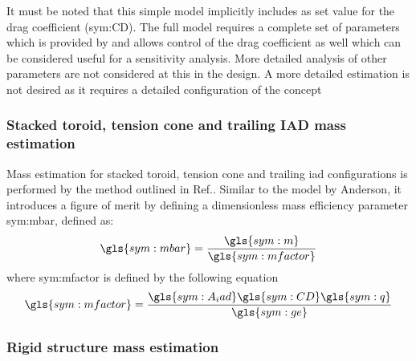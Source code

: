  It must be noted that this simple model implicitly includes as set value for the drag coefficient (\gls{sym:CD}). The full model requires a complete set of parameters which is provided by \cite{Anderson1969} and allows control of the drag coefficient as well which can be considered useful for a sensitivity analysis. More detailed analysis of other parameters are not considered at this in the design. A more detailed estimation is not desired as it requires a detailed configuration of the concept
\subsubsection{Stacked toroid, tension cone and trailing IAD mass estimation}
Mass estimation for stacked toroid, tension cone and trailing \gls{iad} configurations is performed by the method outlined in Ref.\cite{Samareh2011}. Similar to the model by Anderson, it introduces a figure of merit by defining a dimensionless mass efficiency parameter \gls{sym:mbar}, defined as:
\begin{equation}
\gls{sym:mbar} = \frac{\gls{sym:m}}{\gls{sym:mfactor}}
\label{eq:dimmass}
\end{equation}
where \gls{sym:mfactor} is defined by the following equation
\begin{equation}
\gls{sym:mfactor} = \frac{\gls{sym:A_iad} \gls{sym:CD} \gls{sym:q}}{\gls{sym:ge}}
\label{eq:dimmass}
\end{equation}

\subsubsection{Rigid structure mass estimation}
